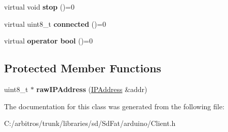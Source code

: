\begin{DoxyCompactItemize}
\item 
\hypertarget{class_client_a0efff8623a2fb79dad94a96dcf16d966}{virtual void {\bfseries stop} ()=0}\label{class_client_a0efff8623a2fb79dad94a96dcf16d966}

\item 
\hypertarget{class_client_a4da62bf6f27e3c10bc4f7b2d92dca244}{virtual uint8\-\_\-t {\bfseries connected} ()=0}\label{class_client_a4da62bf6f27e3c10bc4f7b2d92dca244}

\item 
\hypertarget{class_client_ac496133545cba767b45c6ce8df3587e7}{virtual {\bfseries operator bool} ()=0}\label{class_client_ac496133545cba767b45c6ce8df3587e7}

\end{DoxyCompactItemize}
\subsection*{Protected Member Functions}
\begin{DoxyCompactItemize}
\item 
\hypertarget{class_client_a8a60fab7dbb23ddc33ffa5163daa52b5}{uint8\-\_\-t $\ast$ {\bfseries raw\-I\-P\-Address} (\hyperlink{class_i_p_address}{I\-P\-Address} \&addr)}\label{class_client_a8a60fab7dbb23ddc33ffa5163daa52b5}

\end{DoxyCompactItemize}


The documentation for this class was generated from the following file\-:\begin{DoxyCompactItemize}
\item 
C\-:/arbitros/trunk/libraries/sd/\-Sd\-Fat/arduino/Client.\-h\end{DoxyCompactItemize}
